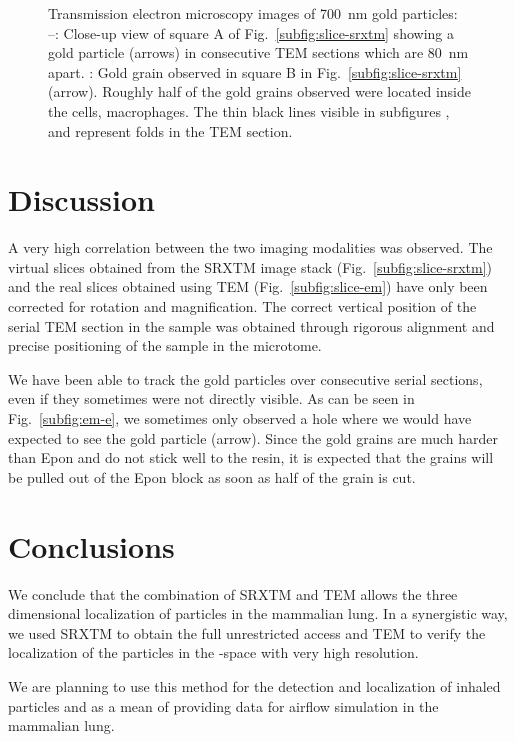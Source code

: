 \begin{figure}[htb]
\caption[Transmission electron microscopy images of gold particles]{Transmission electron microscopy images of \SI{700}{\nano\meter} gold particles: --: Close-up view of square A of Fig.~\ref{subfig:slice-srxtm} showing a gold particle (arrows) in consecutive \ac{TEM} sections which are \SI{80}{\nano\meter} apart. : Gold grain observed in square B in Fig.~\ref{subfig:slice-srxtm} (arrow). Roughly half of the gold grains observed were located inside the cells, \eg macrophages. The thin black lines visible in subfigures ,  and  represent folds in the \ac{TEM} section.}
\label{fig:srxtm-em}
\end{figure}

\section{Discussion}
A very high correlation between the two imaging modalities was observed. The virtual slices obtained from the \ac{SRXTM} image stack (Fig.~\ref{subfig:slice-srxtm}) and the real slices obtained using \ac{TEM} (Fig.~\ref{subfig:slice-em}) have only been corrected for rotation and magnification. The correct vertical position of the serial \ac{TEM} section in the sample was obtained through rigorous alignment and precise positioning of the sample in the microtome.

We have been able to track the gold particles over consecutive serial sections, even if they sometimes were not directly visible. As can be seen in Fig.~\ref{subfig:em-e}, we sometimes only observed a hole where we would have expected to see the gold particle (arrow). Since the gold grains are much harder than Epon and do not stick well to the resin, it is expected that the grains will be pulled out of the Epon block as soon as half of the grain is cut.

\section{Conclusions}
We conclude that the combination of \ac{SRXTM} and \ac{TEM} allows the three dimensional localization of particles in the mammalian lung. In a synergistic way, we used \ac{SRXTM} to obtain the full unrestricted \threed access and \ac{TEM} to verify the localization of the particles in the \threed-space with very high resolution. 

We are planning to use this method for the detection and localization of inhaled particles and as a mean of providing data for airflow simulation in the mammalian lung.

